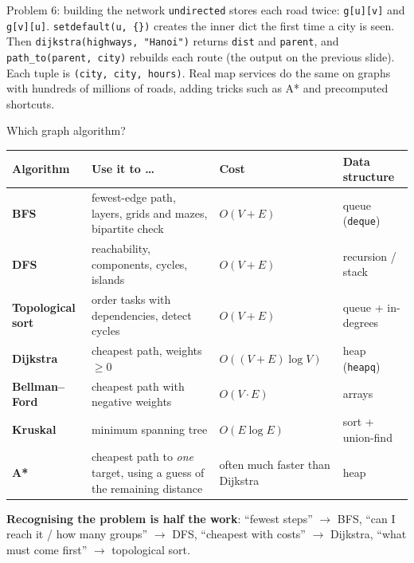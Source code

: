 \documentclass[aspectratio=169,10pt]{beamer}
\begin{document}
\begin{frame}[allowframebreaks]{Problem 6: building the network}
\vspace{2mm}
{\small
\texttt{undirected} stores each road twice: \texttt{g[u][v]} and \texttt{g[v][u]}. \texttt{setdefault(u, \{\})} creates the inner dict the first time a city is seen. Then \texttt{dijkstra(highways, "Hanoi")} returns \texttt{dist} and \texttt{parent}, and \texttt{path\_to(parent, city)} rebuilds each route (the output on the previous slide).}
\framebreak
{}
\vspace{2mm}
{\small
Each tuple is \texttt{(city, city, hours)}. Real map services do the same on graphs with hundreds of millions of roads, adding tricks such as A* and precomputed shortcuts.}
\end{frame}

\begin{frame}{Which graph algorithm?}
\renewcommand{\arraystretch}{1.3}\footnotesize
\begin{tabular}{@{}>{\raggedright\bfseries}p{24mm}>{\raggedright}p{44mm}>{\raggedright}p{26mm}>{\raggedright\arraybackslash}p{28mm}@{}}
\toprule
Algorithm & Use it to \ldots & Cost & Data structure\\\midrule
BFS & fewest-edge path, layers, grids and mazes, bipartite check & $O(V+E)$ & queue (\texttt{deque})\\
DFS & reachability, components, cycles, islands & $O(V+E)$ & recursion / stack\\
Topological sort & order tasks with dependencies, detect cycles & $O(V+E)$ & queue + in-degrees\\
Dijkstra & cheapest path, weights $\ge 0$ & $O((V+E)\log V)$ & heap (\texttt{heapq})\\
Bellman--Ford & cheapest path with negative weights & $O(V\cdot E)$ & arrays\\
Kruskal & minimum spanning tree & $O(E\log E)$ & sort + union-find\\
A* & cheapest path to \emph{one} target, using a guess of the remaining distance & often much faster than Dijkstra & heap\\
\bottomrule
\end{tabular}
\vspace{3mm}

{\small \textbf{Recognising the problem is half the work}: ``fewest steps'' $\to$ BFS, ``can I reach it / how many groups'' $\to$ DFS, ``cheapest with costs'' $\to$ Dijkstra, ``what must come first'' $\to$ topological sort.}
\end{frame}
\end{document}
